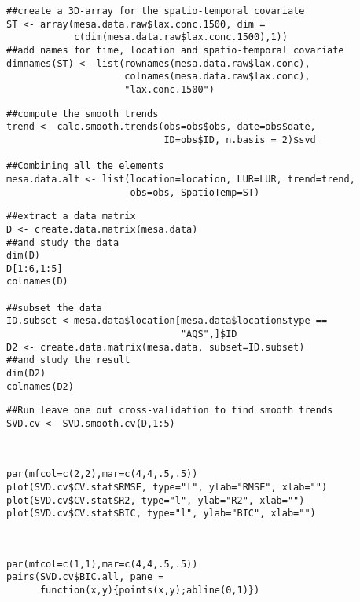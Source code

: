 \begin{verbatim}
##create a 3D-array for the spatio-temporal covariate
ST <- array(mesa.data.raw$lax.conc.1500, dim =
            c(dim(mesa.data.raw$lax.conc.1500),1))
##add names for time, location and spatio-temporal covariate
dimnames(ST) <- list(rownames(mesa.data.raw$lax.conc),
                     colnames(mesa.data.raw$lax.conc),
                     "lax.conc.1500")
\end{verbatim}
\begin{verbatim}
##compute the smooth trends
trend <- calc.smooth.trends(obs=obs$obs, date=obs$date,
                            ID=obs$ID, n.basis = 2)$svd

##Combining all the elements
mesa.data.alt <- list(location=location, LUR=LUR, trend=trend,
                      obs=obs, SpatioTemp=ST)
\end{verbatim}
\begin{verbatim}
##extract a data matrix
D <- create.data.matrix(mesa.data)
##and study the data
dim(D)
D[1:6,1:5]
colnames(D)

##subset the data
ID.subset <-mesa.data$location[mesa.data$location$type ==
                               "AQS",]$ID
D2 <- create.data.matrix(mesa.data, subset=ID.subset)
##and study the result
dim(D2)
colnames(D2)
\end{verbatim}
\begin{verbatim}
##Run leave one out cross-validation to find smooth trends
SVD.cv <- SVD.smooth.cv(D,1:5)
\end{verbatim}
\vspace*{\baselineskip}
\\ %
\vspace*{-1\baselineskip}
\begin{verbatim}
par(mfcol=c(2,2),mar=c(4,4,.5,.5))
plot(SVD.cv$CV.stat$RMSE, type="l", ylab="RMSE", xlab="")
plot(SVD.cv$CV.stat$R2, type="l", ylab="R2", xlab="")
plot(SVD.cv$CV.stat$BIC, type="l", ylab="BIC", xlab="")
\end{verbatim}
\\
%
\vspace*{-1\baselineskip}
\begin{verbatim}
par(mfcol=c(1,1),mar=c(4,4,.5,.5))
pairs(SVD.cv$BIC.all, pane = 
      function(x,y){points(x,y);abline(0,1)})
\end{verbatim}
